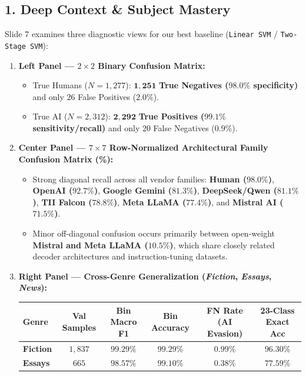 \documentclass[11pt, a4paper]{article}
\begin{document}
\subsection*{1. Deep Context \& Subject Mastery}
Slide 7 examines three diagnostic views for our best baseline (\texttt{Linear SVM} / \texttt{Two-Stage SVM}):
\begin{enumerate}[itemsep=3pt]
    \item \textbf{Left Panel --- $2 \times 2$ Binary Confusion Matrix:}
    \begin{itemize}[noitemsep]
        \item True Humans ($N = 1,277$): $\mathbf{1,251}$ \textbf{True Negatives ($\mathbf{98.0\%}$ specificity)} and only $26$ False Positives ($2.0\%$).
        \item True AI ($N = 2,312$): $\mathbf{2,292}$ \textbf{True Positives ($\mathbf{99.1\%}$ sensitivity/recall)} and only $20$ False Negatives ($0.9\%$).
    \end{itemize}
    \item \textbf{Center Panel --- $7 \times 7$ Row-Normalized Architectural Family Confusion Matrix (\%):}
    \begin{itemize}[noitemsep]
        \item Strong diagonal recall across all vendor families: \textbf{Human ($98.0\%$)}, \textbf{OpenAI ($92.7\%$)}, \textbf{Google Gemini ($81.3\%$)}, \textbf{DeepSeek/Qwen ($81.1\%$)}, \textbf{TII Falcon ($78.8\%$)}, \textbf{Meta LLaMA ($77.4\%$)}, and \textbf{Mistral AI ($71.5\%$)}.
        \item Minor off-diagonal confusion occurs primarily between open-weight \textbf{Mistral and Meta LLaMA ($10.5\%$)}, which share closely related decoder architectures and instruction-tuning datasets.
    \end{itemize}
    \item \textbf{Right Panel --- Cross-Genre Generalization (\textit{Fiction}, \textit{Essays}, \textit{News}):}
    \begin{center}
    \small
    \begin{tabular}{lccccc}
    \toprule
    \textbf{Genre} & \textbf{Val Samples} & \textbf{Bin Macro F1} & \textbf{Bin Accuracy} & \textbf{FN Rate (AI Evasion)} & \textbf{23-Class Exact Acc} \\
    \midrule
    \textbf{Fiction} & $1,837$ & $\mathbf{99.29\%}$ & $99.29\%$ & $0.99\%$ & $\mathbf{96.30\%}$ \\
    \textbf{Essays}  & $665$   & $\mathbf{98.57\%}$ & $99.10\%$ & $0.38\%$ & $77.59\%$ \\

\end{tabular}
\end{center}
\end{enumerate}
\end{document}
